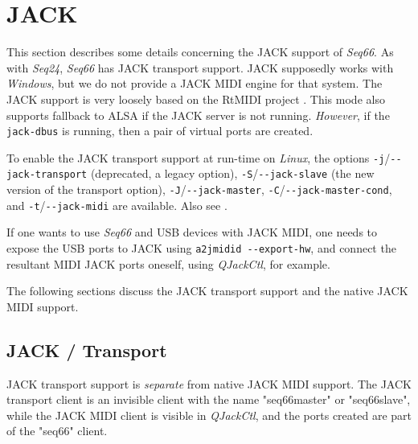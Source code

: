 %
%
%

\section{JACK}
\label{sec:jack}

   This section describes some details concerning the JACK support of
   \textsl{Seq66}.
   As with \textsl{Seq24}, \textsl{Seq66} has JACK transport support.
   JACK supposedly works with \textsl{Windows}, but we do not provide a JACK
   MIDI engine for that system.
   The JACK support is very loosely based on the RtMIDI project
   \cite{rtmidi}.
   This mode also supports fallback to ALSA if the JACK server is not running.
   \textsl{However}, if the \texttt{jack-dbus} is running, then a pair of virtual
   ports are created.

   To enable the JACK transport support at run-time on
   \textsl{Linux}, the options
   \texttt{-j}/\texttt{-{}-jack-transport} (deprecated, a legacy option),
   \texttt{-S}/\texttt{-{}-jack-slave} (the new version of the transport
   option),
   \texttt{-J}/\texttt{-{}-jack-master},
   \texttt{-C}/\texttt{-{}-jack-master-cond},
   and \texttt{-t}/\texttt{-{}-jack-midi} are available.
   Also see .

   If one wants to use \textsl{Seq66} and USB devices
   with JACK MIDI, one needs to expose the USB ports to JACK using
   \texttt{a2jmidid -{}-export-hw}, and connect the resultant MIDI JACK ports
   oneself, using \textsl{QJackCtl}, for example.

   The following sections discuss the JACK transport support and the native
   JACK MIDI support.

\subsection{JACK / Transport}
\label{subsec:jack_transport}

   JACK transport support is \textsl{separate} from native JACK MIDI support.
   The JACK transport client is an invisible client with the
   name "seq66master" or "seq66slave", while the JACK MIDI client is visible in
   \textsl{QJackCtl}, and the ports created are part of the
   "seq66" client.

